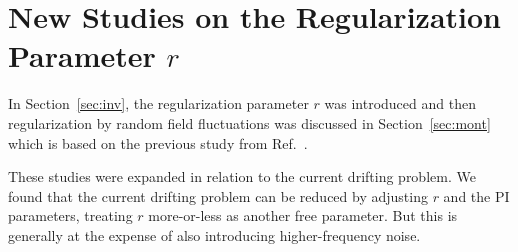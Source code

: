 
% 









\section{New Studies on the Regularization Parameter $r$}\label{sec:new_study_r}

In Section~\ref{sec:inv}, the regularization parameter $r$ was introduced
and then regularization by random field fluctuations was discussed in
Section~\ref{sec:mont} which is based on the previous study from
Ref.~\cite{bea}.

These studies were expanded in relation to the current drifting
problem.  We found that the current drifting problem can be reduced by
adjusting $r$ and the PI parameters, treating $r$ more-or-less as
another free parameter.  But this is generally at the expense of also
introducing higher-frequency noise.

